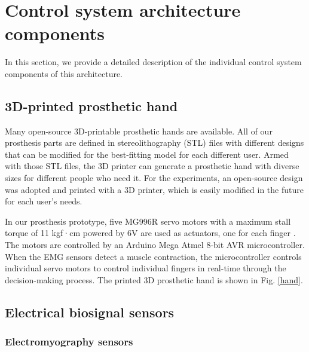 \chapter{Control system architecture components}
In this section, we provide a detailed description of the individual
control system components of this architecture.

\section{3D-printed prosthetic hand}
Many open-source 3D-printable prosthetic hands are available. All of
our prosthesis parts are defined in stereolithography (STL) files
\cite{STL} with different designs that can be modified for the
best-fitting model for each different user.  Armed with those STL
files, the 3D printer can generate a prosthetic hand with diverse
sizes for different people who need it. For the experiments, an
open-source design was adopted and printed with a 3D printer, which is
easily modified in the future for each user's needs.

In our prosthesis prototype, five MG996R servo motors with a maximum
stall torque of 11 kgf·cm powered by 6V are used as actuators, one for
each finger \cite{3D1}. The motors are controlled by an Arduino Mega
Atmel 8-bit AVR microcontroller. When the EMG sensors detect a muscle
contraction, the microcontroller controls individual servo motors to
control individual fingers in real-time through the decision-making
process. The printed 3D prosthetic hand is shown in Fig. \ref{hand}.





\section{Electrical biosignal sensors}

\subsection{Electromyography sensors}

